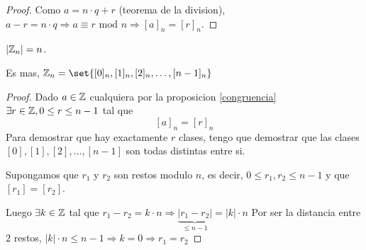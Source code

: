 \begin{proof}
	\label{congruencia}
	Como \(a = n \cdot q + r \) (teorema de la division), \(a - r = n \cdot q \Rightarrow a \equiv r \text{ mod } n \Rightarrow [a]_n = [r]_n\).
\end{proof}

\begin{theorem}
	\(|\mathbb{Z}_n| = n\).
	
	Es mas, \(\Z_n = \set{[0]_n,[1]_n,[2]_n, \ldots, [n-1]_n}\)
\end{theorem}
\begin{proof}
	Dado \(a \in \mathbb{Z} \) cualquiera por la proposicion \ref{congruencia} \(\exists r \in \mathbb{Z}, 0 \leq  r \leq  n - 1 \) tal que
	\[
		[a]_n = [r]_n
	\]
	Para demostrar que hay exactamente \(r \) clases, tengo que demostrar que las clases \([0], [1], [2], \ldots, [n-1 ]\) son todas distintas entre si.
	
	Supongamos que \(r_1 \) y \(r_2 \) son restos modulo \(n \), es decir, \(0 \leq r_1,r_2 \leq n- 1\) y que \([r_1] = [r_2 ]\).
	
	Luego \(\exists k \in \mathbb{Z} \) tal que \(r_1 - r_2 = k \cdot n \Rightarrow \underbrace{|r_{1}-r_{2}|}_{\leq n-1} = |k| \cdot n \)
	Por ser la distancia entre 2 restos, \(|k| \cdot n \leq n - 1 \Rightarrow k = 0 \Rightarrow r_1 = r_2 \)
\end{proof}

